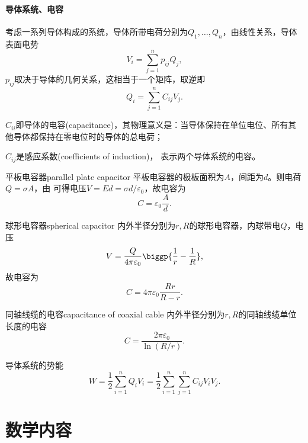 \paragraph{导体系统、电容}
考虑一系列导体构成的系统，导体所带电荷分别为$Q_1,\ldots,Q_n$，由线性关系，导体表面电势
\[
    V_i=\sum_{j=1}^np_{ij}Q_j,
\]
$p_{ij}$取决于导体的几何关系，这相当于一个矩阵，取逆即
\begin{equation}
    Q_i=\sum_{j=1}^nC_{ij}V_j.
\end{equation}
\begin{compactitem}
	\item $C_{ii}$即导体的电容(capacitance)，其物理意义是：当导体保持在单位电位、所有其他导体都保持在零电位时的导体的总电荷；
	\item $C_{ij}$是感应系数(coefficients of induction)，%
    表示两个导体系统的电容。
\end{compactitem}

\begin{example}
    {平板电容器}{parallel plate capacitor}
    平板电容器的极板面积为$A$，间距为$d$。则电荷$Q=\sigma A$，由 可得电压$V=Ed=\sigma d/\varepsilon_0$，故电容为
    \begin{equation}
        C=\varepsilon_0\frac Ad.
    \end{equation}
\end{example}

\begin{example}
    {球形电容器}{spherical capacitor}
    内外半径分别为$r,R$的球形电容器，内球带电$Q$，电压
    \[
        V=\frac Q{4\pi\varepsilon_0}\biggp{\frac1r-\frac1R},
    \]
    故电容为
    \begin{equation}
        C=4\pi\varepsilon_0\frac{Rr}{R-r}.
    \end{equation}
\end{example}

\begin{example}
    {同轴线缆的电容}{capacitance of coaxial cable}
    内外半径分别为$r,R$的同轴线缆单位长度的电容
    \begin{equation}
        C=\frac{2\pi\varepsilon_0}{\ln(R/r)}.
    \end{equation}
\end{example}

导体系统的势能
\[
    W=\frac12\sum_{i=1}^nQ_iV_i=\frac12\sum_{i=1}^n\sum_{j=1}^nC_{ij}V_iV_j.
\]

\section{数学内容}


